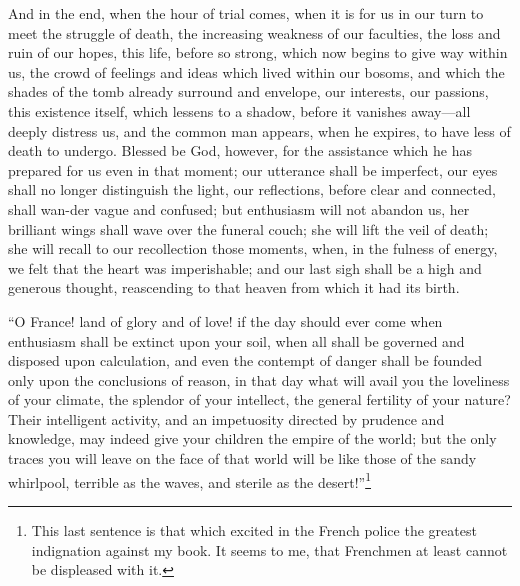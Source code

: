 And in the end, when the hour of trial comes, when it is for us in our
turn to meet the struggle of death, the increasing weakness of our
faculties, the loss and ruin of our hopes, this life, before so
strong, which now begins to give way within us, the crowd of feelings
and ideas which lived within our bosoms, and which the shades of the
tomb already surround and envelope, our interests, our passions, this
existence itself, which lessens to a shadow, before it vanishes
away---all deeply distress us, and the common man appears, when he
expires, to have less of death to undergo. Blessed be God, however,
for the assistance which he has prepared for us even in that moment;
our utterance shall be imperfect, our eyes shall no longer distinguish
the light, our reflections, before clear and connected, shall
wan-der vague and confused; but enthusiasm will not abandon
us, her brilliant wings shall wave over the funeral couch; she will
lift the veil of death; she will recall to our recollection those
moments, when, in the fulness of energy, we felt that the heart was
imperishable; and our last sigh shall be a high and generous thought,
reascending to that heaven from which it had its birth.

``O France! land of glory and of love! if the day should ever come
when enthusiasm shall be extinct upon your soil, when all shall be
governed and disposed upon calculation, and even the contempt of
danger shall be founded only upon the conclusions of reason, in that
day what will avail you the loveliness of your climate, the splendor
of your intellect, the general fertility of your nature? Their
intelligent activity, and an impetuosity directed by prudence and
knowledge, may indeed give your children the empire of the world; but
the only traces you will leave on the face of that world will be like
those of the sandy whirlpool, terrible as the waves, and sterile as
the desert!''\footnote{This last sentence is that which excited in the
French police the greatest indignation against my book. It seems to
me, that Frenchmen at least cannot be displeased with it.}

